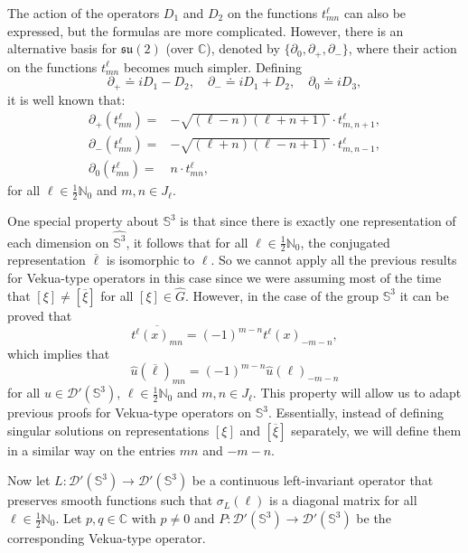 \documentclass[sn-mathphys-num]{sn-jnl}%
\numberwithin{equation}{section}
\theoremstyle{thmstyleone}
\theoremstyle{thmstyletwo}
\theoremstyle{thmstylethree}
\begin{document}
The action of the operators $D_1$ and $D_2$ on the functions $t^\ell_{mn}$ can also be expressed, but the formulas are more complicated. However, there is an alternative basis for $\mathfrak{su}(2)$ (over $\mathbb{C}$), denoted by $\{\partial_0, \partial_+, \partial_-\}$, where their action on the functions $t^\ell_{mn}$ becomes much simpler. Defining
$$
\partial_+ \doteq iD_1 - D_2, \quad \partial_- \doteq iD_1 + D_2, \quad \partial_0 \doteq iD_3,
$$
it is well known that:
\begin{align}\label{tabela}
	\partial_+(t^\ell_{mn})  = & -\sqrt{(\ell - n)(\ell + n + 1)} \cdot t^{\ell}_{m, n+1}, \nonumber \\
	\partial_-(t^\ell_{mn})  = & -\sqrt{(\ell + n)(\ell - n + 1)} \cdot t^{\ell}_{m, n-1}, \nonumber \\
	\partial_0(t^\ell_{mn})  = & n \cdot t^\ell_{mn},
\end{align}
for all $\ell \in \frac{1}{2}\mathbb{N}_0$ and $m, n \in J_\ell$.

One special property about $\mathbb{S}^3$ is that since there is exactly one representation of each dimension on $\widehat{\mathbb{S}^3}$, it follows that for all $\ell \in \frac{1}{2}\mathbb{N}_0$, the conjugated representation $\overline{\ell}$ is isomorphic to $\ell$. So we cannot apply all the previous results for Vekua-type operators in this case since we were assuming most of the time that $[\xi] \neq [\overline{\xi}]$ for all $[\xi]\in \widehat{G}$. However, in the case of the group $\mathbb{S}^3$ it can be proved that
$$\overline{t^\ell(x)_{mn}}=(-1)^{m-n} t^\ell(x)_{-m -n},$$ 
which implies that
\begin{equation}\label{conj}
	\widehat{u}(\overline{\ell})_{mn} = (-1)^{m-n} \widehat{u}(\ell)_{-m-n}
\end{equation}
for all $u \in \mathcal{D}'(\mathbb{S}^3)$, $\ell \in \frac{1}{2}\mathbb{N}_0$ and $m,n \in J_\ell$. 
This property will allow us to adapt previous proofs for Vekua-type operators on $\mathbb{S}^3$. Essentially, instead of defining singular solutions on representations $[\xi]$ and $[\overline{\xi}]$ separately, we will define them in a similar way on the entries $mn$ and $-m-n$.

Now let $L: \mathcal{D}'(\mathbb{S}^3) \rightarrow \mathcal{D}'(\mathbb{S}^3)$ be a continuous left-invariant operator that preserves smooth functions such that $\sigma_L(\ell)$ is a diagonal matrix for all $\ell \in \frac{1}{2}\mathbb{N}_0$. Let $p,q \in \mathbb{C}$ with $p \neq 0$ and $P: \mathcal{D}'(\mathbb{S}^3) \rightarrow \mathcal{D}'(\mathbb{S}^3)$ be the corresponding Vekua-type operator.
\end{document}
